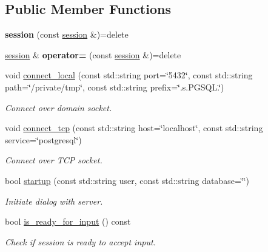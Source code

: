 \subsection*{Public Member Functions}
\begin{DoxyCompactItemize}
\item 
\mbox{\label{classsession_aa8722751d1aa3b5809f174ebff455d10}} 
{\bfseries session} (const \hyperlink{classsession}{session} \&)=delete
\item 
\mbox{\label{classsession_a5b2dc1a39c6488288c3fe7a9280cbb04}} 
\hyperlink{classsession}{session} \& {\bfseries operator=} (const \hyperlink{classsession}{session} \&)=delete
\item 
void \hyperlink{classsession_a62fd1e9e8689c5692e4ab0f31b693586}{connect\+\_\+local} (const std\+::string port=\char`\"{}5432\char`\"{}, const std\+::string path=\char`\"{}/private/tmp\char`\"{}, const std\+::string prefix=\char`\"{}.s.\+P\+G\+S\+Q\+L.\char`\"{})
\begin{DoxyCompactList}\small\item\em Connect over domain socket. \end{DoxyCompactList}\item 
void \hyperlink{classsession_a0149dd75fe574a54c083340a2303a919}{connect\+\_\+tcp} (const std\+::string host=\char`\"{}localhost\char`\"{}, const std\+::string service=\char`\"{}postgresql\char`\"{})
\begin{DoxyCompactList}\small\item\em Connect over T\+CP socket. \end{DoxyCompactList}\item 
bool \hyperlink{classsession_a251ef96690813b1ef4e3632082ce5fc3}{startup} (const std\+::string user, const std\+::string database=\char`\"{}\char`\"{})
\begin{DoxyCompactList}\small\item\em Initiate dialog with server. \end{DoxyCompactList}\item 
\mbox{\label{classsession_a909e52300bb931f351902755ce70e806}} 
bool \hyperlink{classsession_a909e52300bb931f351902755ce70e806}{is\+\_\+ready\+\_\+for\+\_\+input} () const
\begin{DoxyCompactList}\small\item\em Check if session is ready to accept input. \end{DoxyCompactList}\item 

\end{DoxyCompactItemize}
